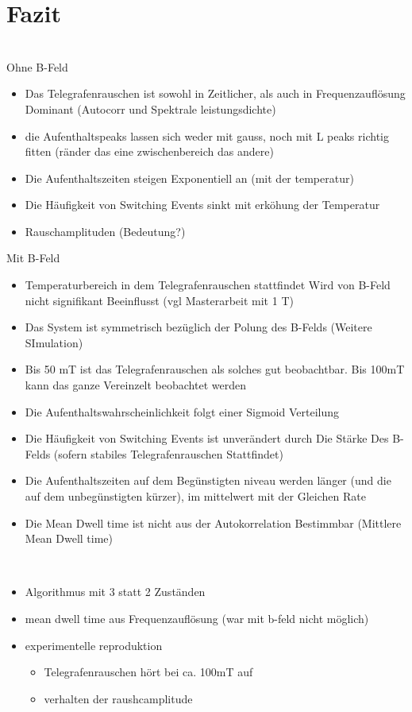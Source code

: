 \documentclass[main.tex]{subfiles}
\begin{document}
\newpage
\section{Fazit}

\\
Ohne B-Feld
\begin{itemize}
    \item Das Telegrafenrauschen ist sowohl in Zeitlicher, als auch in Frequenzauflösung Dominant (Autocorr und Spektrale leistungsdichte)
    \item die Aufenthaltspeaks lassen sich weder mit gauss, noch mit L peaks richtig fitten (ränder das eine zwischenbereich das andere)
    \item Die Aufenthaltszeiten steigen Exponentiell an (mit der temperatur)
    \item Die Häufigkeit von Switching Events sinkt mit erköhung der Temperatur
    \item Rauschamplituden (Bedeutung?)
\end{itemize}

Mit B-Feld
\begin{itemize}
    \item Temperaturbereich in dem Telegrafenrauschen stattfindet Wird von B-Feld nicht signifikant Beeinflusst (vgl Masterarbeit mit 1 T)
    \item Das System ist symmetrisch bezüglich der Polung des B-Felds (Weitere SImulation)
    \item Bis 50 mT ist das Telegrafenrauschen als solches gut beobachtbar. Bis 100mT kann das ganze Vereinzelt beobachtet werden
    \item Die Aufenthaltswahrscheinlichkeit folgt einer Sigmoid Verteilung
    \item Die Häufigkeit von Switching Events ist unverändert durch Die Stärke Des B-Felds (sofern stabiles Telegrafenrauschen Stattfindet)
    \item Die Aufenthaltszeiten auf dem Begünstigten niveau werden länger (und die auf dem unbegünstigten kürzer), im mittelwert mit der Gleichen Rate
    \item Die Mean Dwell time ist nicht aus der Autokorrelation Bestimmbar (Mittlere Mean Dwell time)
\end{itemize}
\\
\begin{itemize}
    \item Algorithmus mit 3 statt 2 Zuständen
    \item mean dwell time aus Frequenzauflösung (war mit b-feld nicht möglich)
    \item experimentelle reproduktion 
    \begin{itemize}
        \item Telegrafenrauschen hört bei ca. 100mT auf
        \item verhalten der raushcamplitude
    \end{itemize}
\end{itemize}
\end{document}
